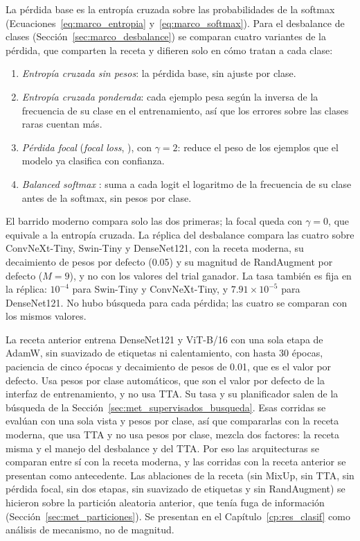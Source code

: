 La pérdida base es la entropía cruzada sobre las probabilidades de la softmax (Ecuaciones~\ref{eq:marco_entropia}
y~\ref{eq:marco_softmax}). Para el desbalance de clases (Sección~\ref{sec:marco_desbalance}) se comparan cuatro variantes de
la pérdida, que comparten la receta y difieren solo en cómo tratan a cada clase:
\begin{enumerate}
    \item \emph{Entropía cruzada sin pesos}: la pérdida base, sin ajuste por clase.
    \item \emph{Entropía cruzada ponderada}: cada ejemplo pesa según la inversa de la frecuencia de su clase en el
    entrenamiento, así que los errores sobre las clases raras cuentan más.
    \item \emph{Pérdida focal} (\emph{focal loss}, \cite{lin2017focal}), con $\gamma = 2$: reduce el peso de los ejemplos
    que el modelo ya clasifica con confianza.
    \item \emph{Balanced softmax} \cite{ren2020balanced}: suma a cada logit el logaritmo de la frecuencia de su
    clase antes de la softmax, sin pesos por clase.
\end{enumerate}
El barrido moderno compara solo las dos primeras; la focal queda con $\gamma = 0$, que equivale a la entropía cruzada. La
réplica del desbalance compara las cuatro sobre ConvNeXt-Tiny, Swin-Tiny y DenseNet121, con la receta moderna, su
decaimiento de pesos por defecto (0.05) y su magnitud de RandAugment por defecto ($M = 9$), y no con los valores del trial
ganador. La tasa también es fija en la réplica: $10^{-4}$ para Swin-Tiny y ConvNeXt-Tiny, y $7.91 \times 10^{-5}$ para
DenseNet121. No hubo búsqueda para cada pérdida; las cuatro se comparan con los mismos valores.

La receta anterior entrena DenseNet121 y ViT-B/16 con una sola etapa de AdamW, sin suavizado de etiquetas ni
calentamiento, con hasta 30 épocas, paciencia de cinco épocas y decaimiento de pesos de 0.01, que es el valor por defecto.
Usa pesos por clase automáticos, que son el valor por defecto de la interfaz de entrenamiento, y no usa TTA. Su tasa y su
planificador salen de la búsqueda de la Sección~\ref{sec:met_supervisados_busqueda}. Esas corridas se evalúan con una sola vista
y pesos por clase, así que compararlas con la receta moderna, que usa TTA y no usa pesos por clase, mezcla dos factores: la
receta misma y el manejo del desbalance y del TTA. Por eso las arquitecturas se comparan entre sí con la receta moderna, y
las corridas con la receta anterior se presentan como antecedente. Las ablaciones de la receta
(sin MixUp, sin TTA, sin pérdida focal, sin dos etapas, sin suavizado de etiquetas y sin RandAugment) se hicieron sobre la
partición aleatoria anterior, que tenía fuga de información (Sección~\ref{sec:met_particiones}). Se presentan en el
Capítulo~\ref{cp:res_clasif} como análisis de mecanismo, no de magnitud.

